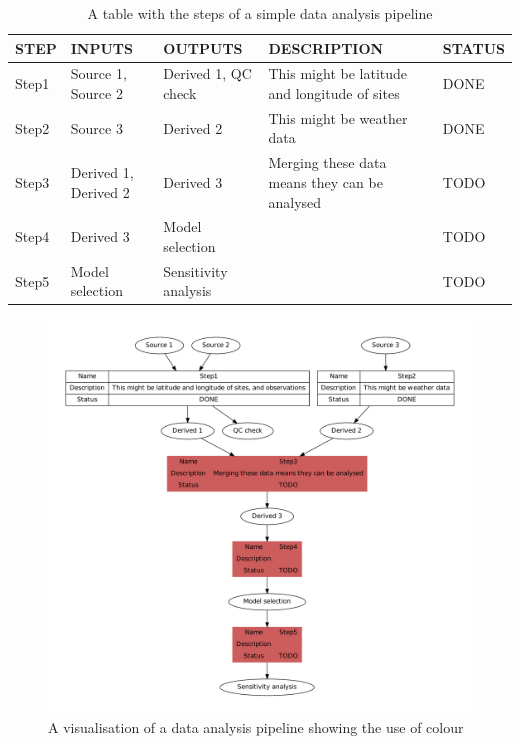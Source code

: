 \documentclass[11pt,a4paper]{article}
\begin{document}
\begin{table}[!ht]
\centering
\caption{A table with the steps of a simple data analysis pipeline} 
\label{tab:TablePipe1}
\begin{tabular}{p{.6in}p{1.3in}p{1.2in}p{2in}p{1in}}
  \hline
STEP & INPUTS & OUTPUTS & DESCRIPTION & STATUS \\ 
  \hline
Step1 & Source 1, Source 2 & Derived 1, QC check & This might be latitude and longitude of sites & DONE \\ 
  Step2 & Source 3 & Derived 2 & This might be weather data & DONE \\ 
  Step3 & Derived 1, Derived 2 & Derived 3 & Merging these data means they can be analysed & TODO \\ 
  Step4 & Derived 3 & Model selection &  & TODO \\ 
  Step5 & Model selection & Sensitivity analysis &  & TODO \\ 
   \hline
\end{tabular}
\end{table}

\begin{figure}[!h]
\centering
\includegraphics[width=\textwidth]{images/steps-fig1.pdf}
\caption{A visualisation of a data analysis pipeline showing the use of colour}
\label{fig:FigSteps}
\end{figure}

\clearpage
\end{document}
